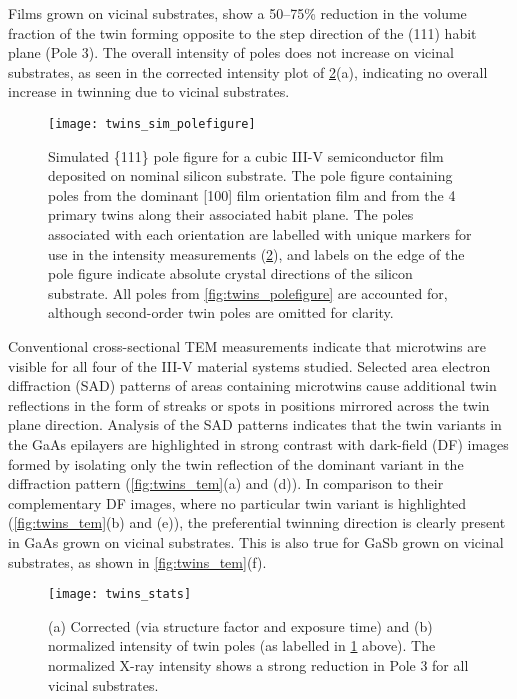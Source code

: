 Films grown on vicinal substrates, show a 50--75\% reduction in the volume fraction of the twin forming opposite to the step direction of the (111) habit plane (Pole 3).
The overall intensity of poles does not increase on vicinal substrates, as seen in the corrected intensity plot of \cref{fig:twins_stats}(a), indicating no overall increase in twinning due to vicinal substrates.
\begin{figure}
 \centering \texttt{[image: twins\_sim\_polefigure]}
 \caption[Simulated pole figure of twinned III-V on nominal silicon]{\label{fig:twins_sim_polefigure}Simulated \{111\} pole figure for a cubic III-V semiconductor film deposited on nominal silicon substrate.
  The pole figure containing poles from the dominant [100] film orientation film and from the 4 primary twins along their associated habit plane.
  The poles associated with each orientation are labelled with unique markers for use in the intensity measurements (\cref{fig:twins_stats}), and labels on the edge of the pole figure indicate absolute crystal directions of the silicon substrate.
  All poles from \cref{fig:twins_polefigure} are accounted for, although second-order twin poles are omitted for clarity.}
\end{figure}
Conventional cross-sectional TEM measurements indicate that microtwins are visible for all four of the III-V material systems studied.
Selected area electron diffraction (SAD) patterns of areas containing microtwins cause additional twin reflections in the form of streaks or spots in positions mirrored across the twin plane direction.
Analysis of the SAD patterns indicates that the twin variants in the GaAs epilayers are highlighted in strong contrast with dark-field (DF) images formed by isolating only the twin reflection of the dominant variant in the diffraction pattern (\cref{fig:twins_tem}(a) and (d)).
In comparison to their complementary DF images, where no particular twin variant is highlighted (\cref{fig:twins_tem}(b) and (e)), the preferential twinning direction is clearly present in GaAs grown on vicinal substrates.
This is also true for GaSb grown on vicinal substrates, as shown in \cref{fig:twins_tem}(f).
\begin{figure}
 \centering \texttt{[image: twins\_stats]}
 \caption[Integrated x-ray intensities from pole figures]{\label{fig:twins_stats}(a) Corrected (via structure factor and exposure time) and (b) normalized intensity of twin poles (as labelled in \cref{fig:twins_sim_polefigure} above).
  The normalized X-ray intensity shows a strong reduction in Pole 3 for all vicinal substrates.}
\end{figure}

